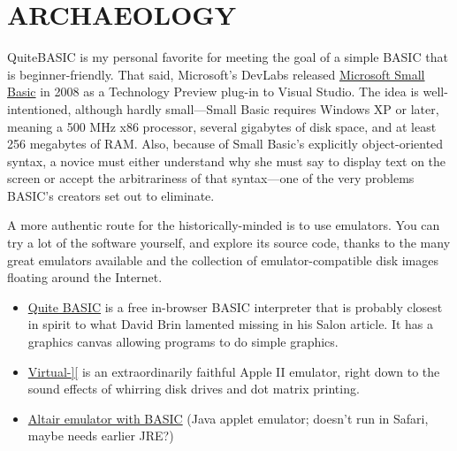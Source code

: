 \documentclass{article}
\begin{document}
\section{ARCHAEOLOGY}


QuiteBASIC is my personal favorite for meeting the goal of a simple
BASIC that is beginner-friendly.  That said,
Microsoft's DevLabs 
released \href{http://smallbasic.com}{Microsoft Small Basic} in 2008 as a
Technology Preview plug-in to Visual Studio.
The idea is well-intentioned, although hardly small---Small Basic
requires Windows XP or later, meaning a 500
MHz x86 processor, several gigabytes of disk space, and at least 256
megabytes of RAM.
Also, because of Small Basic's explicitly
object-oriented syntax,  a novice must either understand why she
must say  to display text on the
screen or accept the arbitrariness of that syntax---one of the very problems
BASIC's creators set out to eliminate.  

A more authentic route for the historically-minded is to use emulators.
You can try a lot of the software yourself, and explore
its source code, thanks to the many great emulators available and the
collection of emulator-compatible disk images floating around the Internet.

\begin{itemize}

\item \href{http://quitebasic.com}{Quite BASIC} is a free in-browser BASIC
  interpreter that is probably closest in spirit to what David Brin
  lamented missing in his Salon article.  It has a graphics canvas
  allowing programs to do simple graphics.

\item \href{http://virtualii.com}{Virtual-][} is an extraordinarily
  faithful Apple II emulator, right down to the sound effects of
  whirring disk drives and dot matrix printing.

\item \href{http://web.archive.org/web/20011211231432/http://www.rjh.org.uk/altair/4k/em/altem.htm}{Altair emulator with BASIC} (Java applet emulator; doesn't run in Safari,
maybe needs earlier JRE?)

\end{itemize}


\end{document}
